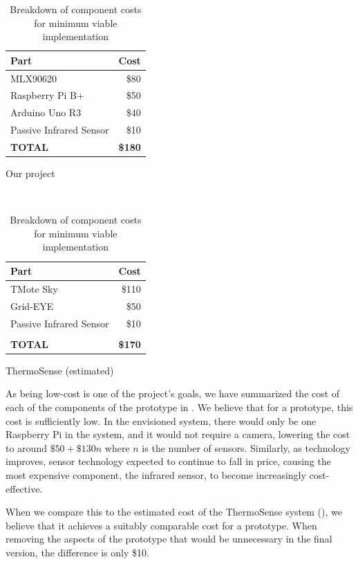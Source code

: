\documentclass[../thesis/thesis.tex]{subfiles}
\begin{document}
\begin{table}
\centering
\begin{subtable}[b]{0.5\textwidth}
\centering
\begin{tabular}{|l|r|}
\hline
\textbf{Part} & \textbf{Cost} \\ \hline
MLX90620 & \$80 \\ \hline
Raspberry Pi B+ &  \$50 \\ \hline
Arduino Uno R3 & \$40 \\ \hline
Passive Infrared Sensor & \$10 \\ \hline
\textbf{TOTAL} & \textbf{\$180} \\ \hline
\end{tabular}
\caption{Our project}
\label{tab:sensor:cost}
\end{subtable}%
~%
\begin{subtable}[b]{0.5\textwidth}
\centering
\begin{tabular}{|l|r|}
\hline
\textbf{Part} & \textbf{Cost} \\ \hline
TMote Sky & \$110 \\ \hline
Grid-EYE & \$50 \\ \hline
Passive Infrared Sensor & \$10 \\ \hline
 & \\ \hline
\textbf{TOTAL} & \textbf{\$170} \\ \hline
\end{tabular}
\caption{ThermoSense (estimated)}
\label{tab:sensor:thermosensecost}
\end{subtable}
\caption{Breakdown of component costs for minimum viable implementation}
\end{table}

As being low-cost is one of the project's goals, we have summarized the cost of each of the components of the prototype in . We believe that for a prototype, this cost is sufficiently low. In the envisioned system, there would only be one Raspberry Pi in the system, and it would not require a camera, lowering the cost to around $\$50 + \$130n$ where $n$ is the number of sensors. Similarly, as technology improves, sensor technology expected to continue to fall in price, causing the most expensive component, the infrared sensor, to become increasingly cost-effective.

When we compare this to the estimated cost of the ThermoSense system (), we believe that it achieves a suitably comparable cost for a prototype. When removing the aspects of the prototype that would be unnecessary in the final version, the difference is only \$10.
\end{document}
